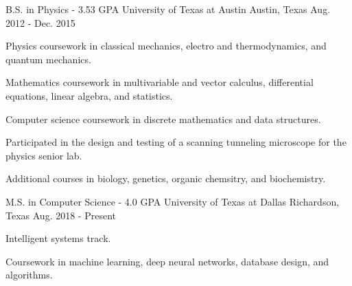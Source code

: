 

\begin{cventries}

  \cventry
    {B.S. in Physics - 3.53 GPA} %
    {University of Texas at Austin} %
    {Austin, Texas} %
    {Aug. 2012 - Dec. 2015} %
    {
      \begin{cvitems} %
        \item {
			Physics coursework in classical mechanics, electro and
			thermodynamics, and quantum mechanics.
		}
        \item {
			Mathematics coursework in multivariable and vector
			calculus,
			differential equations, linear algebra,
			\newline
			and statistics.
		}
        \item {
			Computer science coursework in discrete mathematics and
			data structures.
		}
        \item {
			Participated in the design and testing of a scanning
			tunneling microscope for the physics senior lab.
		}
        \item {
			Additional courses in biology, genetics, organic
			chemsitry, and biochemistry.
		}
      \end{cvitems}
    }

  \cventry
    {M.S. in Computer Science - 4.0 GPA} %
    {University of Texas at Dallas} %
    {Richardson, Texas} %
    {Aug. 2018 - Present} %
    {
      \begin{cvitems} %
        \item {Intelligent systems track.}
        \item {
			Coursework in machine learning, deep neural networks,
			database design, and algorithms.
		}
      \end{cvitems}
    }

\end{cventries}
